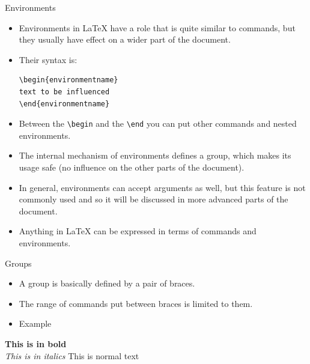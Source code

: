 \documentclass[style=lehigh,orient=landscape]{powerdot}
\begin{document}
\begin{wideslide}[bm={Environments},method=direct]{Environments}
  \begin{itemize}
  \item Environments in LaTeX have a role that is quite similar to commands, but they usually have effect on a wider part of the document. 
  \item Their syntax is:
    \begin{lstlisting}
\begin{environmentname}
text to be influenced
\end{environmentname}
    \end{lstlisting}
  \item Between the \lstinline|\begin| and the \lstinline|\end| you can put other commands and nested environments. 
  \item The internal mechanism of environments defines a group, which makes its usage safe (no influence on the other parts of the document).
  \item In general, environments can accept arguments as well, but this feature is not commonly used and so it will be discussed in more advanced parts of the document.
  \item Anything in LaTeX can be expressed in terms of commands and environments.
  \end{itemize}	
\end{wideslide}

\begin{wideslide}[bm={Groups},method=direct]{Groups}
  \begin{itemize}
  \item A group is basically defined by a pair of braces.
  \item The range of commands put between braces is limited to them.
  \item Example
  \end{itemize}	
  \begin{LTXexample}[numbers=none,pos=b]
{\bf This is in bold}\\
{\em This is in italics}
This is normal text
  \end{LTXexample}
\end{wideslide}
\end{document}
